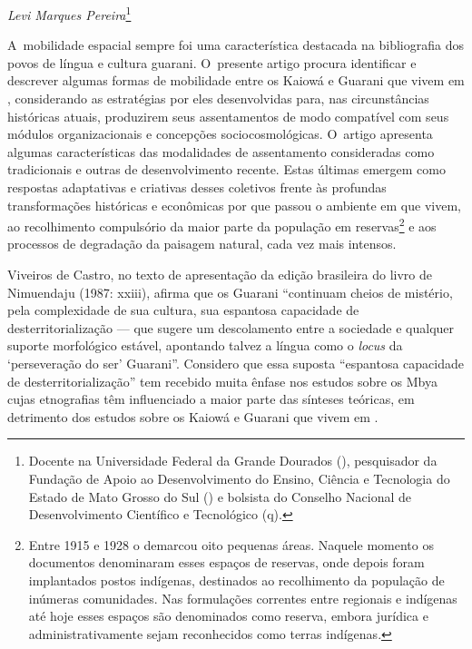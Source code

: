\begin{flushright}
\emph{Levi Marques Pereira}\footnote{Docente na Universidade Federal da
Grande Dourados (), pesquisador da Fundação de Apoio ao Desenvolvimento do Ensino, Ciência e Tecnologia do Estado de Mato Grosso do Sul () e bolsista do Conselho Nacional de Desenvolvimento Científico e Tecnológico (q).} 
\end{flushright}

\noindent
A~mobilidade espacial sempre foi uma característica destacada na
bibliografia dos povos de língua e cultura guarani. O~presente artigo
procura identificar e descrever algumas formas de mobilidade entre os
Kaiowá e Guarani que vivem em , considerando as estratégias por eles
desenvolvidas para, nas circunstâncias históricas atuais, produzirem
seus assentamentos de modo compatível com seus módulos organizacionais
e concepções sociocosmológicas. O~artigo apresenta algumas
características das modalidades de assentamento consideradas como
tradicionais e outras de desenvolvimento recente. Estas últimas emergem
como respostas adaptativas e criativas desses coletivos frente às
profundas transformações históricas e econômicas por que passou o
ambiente em que vivem, ao recolhimento compulsório da maior parte da
população em reservas\footnote{Entre 1915 e 1928 o  demarcou oito
pequenas áreas. Naquele momento os documentos denominaram esses espaços
de reservas, onde depois foram implantados postos indígenas, destinados
ao recolhimento da população de inúmeras comunidades. Nas formulações
correntes entre regionais e indígenas até hoje esses espaços são
denominados como reserva, embora jurídica e administrativamente sejam
reconhecidos como terras indígenas.\par } e aos processos de degradação
da paisagem natural, cada vez mais intensos.

Viveiros de Castro, no texto de apresentação da edição brasileira do
livro de Nimuendaju (1987: xxiii), afirma que os Guarani ``continuam
cheios de mistério, pela complexidade de sua cultura, sua espantosa
capacidade de desterritorialização --- que sugere um descolamento entre a
sociedade e qualquer suporte morfológico estável, apontando talvez a
língua como o \emph{locus} da ‘perseveração do ser’ Guarani''. Considero que
essa suposta ``espantosa capacidade de desterritorialização'' tem
recebido muita ênfase nos estudos sobre os Mbya cujas etnografias têm
influenciado a maior parte das sínteses teóricas, em detrimento dos
estudos sobre os Kaiowá e Guarani que vivem em . 

